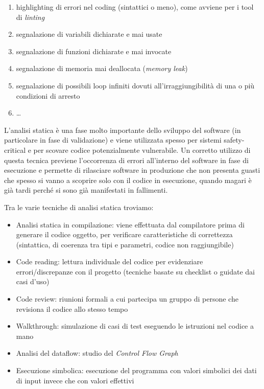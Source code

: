 \documentclass{article}
\begin{document}
\begin{enumerate}
    \item highlighting di errori nel coding (sintattici o meno), come avviene
    per i tool di \emph{linting}
    \item segnalazione di variabili dichiarate e mai usate
    \item segnalazione di funzioni dichiarate e mai invocate
    \item segnalazione di memoria mai deallocata (\emph{memory leak})
    \item segnalazione di possibili loop infiniti dovuti all'irraggiungibilità
    di una o più condizioni di arresto
    \item \ldots
\end{enumerate}

L'analisi statica è una fase molto importante dello sviluppo del software (in
particolare in fase di validazione) e viene utilizzata spesso per sistemi
safety-critical e per scovare codice potenzialmente vulnerabile. Un corretto
utilizzo di questa tecnica previene l'occorrenza di errori all'interno del
software in fase di esecuzione e permette di rilasciare software in produzione
che non presenta guasti che spesso si vanno a scoprire solo con il codice in
esecuzione, quando magari è già tardi perché si sono già manifestati in fallimenti.

Tra le varie tecniche di analisi statica troviamo:

\begin{itemize}
    \item Analisi statica in compilazione: viene effettuata dal compilatore
    prima di generare il codice oggetto, per verificare caratteristiche di
    correttezza (sintattica, di coerenza tra tipi e parametri, codice non raggiungibile)
    \item Code reading: lettura individuale del codice per evidenziare
    errori/discrepanze con il progetto (tecniche basate su checklist o guidate
    dai casi d'uso)
    \item Code review: riunioni formali a cui partecipa un gruppo di persone che
    revisiona il codice allo stesso tempo
    \item Walkthrough: simulazione di casi di test eseguendo le istruzioni nel
    codice a mano
    \item Analisi del dataflow: studio del \emph{Control Flow Graph}
    \item Esecuzione simbolica: esecuzione del programma con valori simbolici
    dei dati di input invece che con valori effettivi
\end{itemize}
\end{document}

